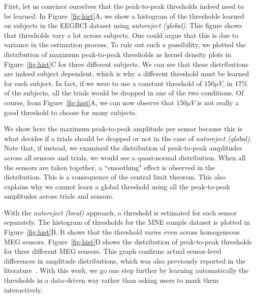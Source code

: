First, let us convince ourselves that the peak-to-peak thresholds indeed need to be learned. In Figure~\ref{fig:hist}A, we show a histogram of the thresholds learned on subjects in the EEGBCI dataset using \emph{autoreject (global)}. This figure shows that thresholds vary a lot across subjects. One could argue that this is due to variance in the estimation process. To rule out such a possibility, we plotted the distribution of maximum peak-to-peak thresholds as kernel density plots in Figure~\ref{fig:hist}C for three different subjects. We can see that these distributions are indeed subject dependent, which is why a different threshold must be learned for each subject. In fact, if we were to use a constant threshold of $150 \mu{V}$, in $17\%$ of the subjects, all the trials would be dropped in one of the two conditions. Of course, from Figure~\ref{fig:hist}A, we can now observe that $150 \mu{V}$ is not really a good threshold to choose for many subjects.
%

We show here the maximum peak-to-peak amplitude per sensor because this is what decides if a trials should be dropped or not in the case of \emph{autoreject (global)}. Note that, if instead, we examined the distribution of peak-to-peak amplitudes across all sensors and trials, we would see a quasi-normal distribution. When all the sensors are taken together, a ``smoothing" effect is observed in the distribution. This is a consequence of the central limit theorem. This also explains why we cannot learn a global threshold using all the peak-to-peak amplitudes across trials and sensors.

With the \emph{autoreject (local)} approach, a threshold is estimated for each sensor separately. The histogram of thresholds for the MNE sample dataset is plotted in Figure~\ref{fig:hist}B. It shows that the threshold varies even across homogeneous MEG sensors. Figure~\ref{fig:hist}D shows the distribution of peak-to-peak thresholds for three different MEG sensors. This graph confirms actual sensor-level differences in amplitude distributions, which was also previously reported in the literature~\citep{junghofer2000statistical}. With this work, we go one step further by learning automatically the thresholds in a data-driven way rather than asking users to mark them interactively.


